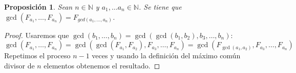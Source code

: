 \documentclass{article}
\theoremstyle{theorem-style}  %
\newtheorem{proposition}{Proposición}
\theoremstyle{definition}
\theoremstyle{example-style}
\begin{document}
    \begin{proposition}
        Sean $n \in \mathbb{N}$ y $a_1, \dots a_n \in \mathbb{N}$. Se tiene que 
        $\gcd(F_{a_1}, \dots, F_{a_n}) = F_{gcd(a_1, \dots, a_n)}$. 
    \end{proposition}
    \begin{proof}
        Usaremos que $\gcd(b_1, \dots, b_n) = \gcd( \gcd(b_1, b_2), b_3, \dots, b_n)$:
        $$ \gcd(F_{a_1}, \dots, F_{a_n}) = \gcd(\gcd(F_{a_1},F_{a_2}), F_{a_3}, \dots, F_{a_n}) = \gcd(F_{\gcd(a_1, a_2)}, F_{a_3}, \dots, F_{a_n}) $$
        Repetimos el proceso $n-1$ veces y usando la definición del máximo común divisor de $n$ elementos obtenemos el resultado.
    \end{proof}
\end{document}
